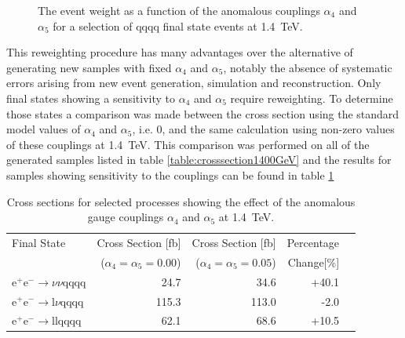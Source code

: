 \begin{figure}[h!]
\caption[The event weight as a function of the anomalous couplings $\alpha_{4}$ and $\alpha_{5}$ for a selection of \nu{\nu}qqqq final state events at 1.4~TeV.]{The event weight as a function of the anomalous couplings $\alpha_{4}$ and $\alpha_{5}$ for a selection of \nu{\nu}qqqq final state events at 1.4~TeV.}
\label{fig:eventweights1400raw}
\end{figure}

This reweighting procedure has many advantages over the alternative of generating new samples with fixed $\alpha_{4}$ and $\alpha_{5}$, notably the absence of systematic errors arising from new event generation, simulation and reconstruction.  Only final states showing a sensitivity to $\alpha_{4}$ and $\alpha_{5}$ require reweighting.  To determine those states a comparison was made between the cross section using the standard model values of $\alpha_{4}$ and $\alpha_{5}$, i.e. 0, and the same calculation using non-zero values of these couplings at 1.4~TeV.  This comparison was performed on all of the generated samples listed in table \ref{table:crosssection1400GeV} and the results for samples showing sensitivity to the couplings can be found in table \ref{table:crosssectionsensitivity1400}

\begin{table}[h!]
\centering
\begin{tabular}{ l r r r r }
\hline
Final State & Cross Section [fb] & Cross Section [fb] & Percentage \\ 
& ($\alpha_{4} = \alpha_{5} = 0.00$) & ($\alpha_{4} = \alpha_{5} = 0.05$) & Change[\%] \\ 
\hline
$\text{e}^{+}\text{e}^{-} \rightarrow \nu{\nu}\text{qqqq}$ & 24.7 & 34.6 & +40.1 \\
$\text{e}^{+}\text{e}^{-} \rightarrow \text{l}{\nu}\text{qqqq}$ & 115.3 & 113.0 & -2.0 \\
$\text{e}^{+}\text{e}^{-} \rightarrow \text{llqqqq}$ & 62.1 & 68.6 & +10.5 \\
\hline
\end{tabular}
\caption[Cross sections for selected processes showing the effect of the anomalous gauge couplings $\alpha_{4}$ and $\alpha_{5}$ at 1.4~TeV.]{Cross sections for selected processes showing the effect of the anomalous gauge couplings $\alpha_{4}$ and $\alpha_{5}$ at 1.4~TeV.}
\label{table:crosssectionsensitivity1400}
\end{table}

